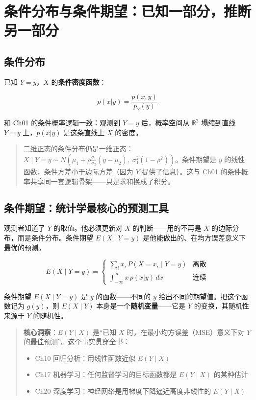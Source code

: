\documentclass[
]{book}
\providecommand{\tightlist}{%
  \setlength{\itemsep}{0pt}\setlength{\parskip}{0pt}}
\begin{document}
\section{条件分布与条件期望：已知一部分，推断另一部分}\label{ux6761ux4ef6ux5206ux5e03ux4e0eux6761ux4ef6ux671fux671bux5df2ux77e5ux4e00ux90e8ux5206ux63a8ux65adux53e6ux4e00ux90e8ux5206}

\subsection{条件分布}\label{ux6761ux4ef6ux5206ux5e03}

已知 \(Y = y\)，\(X\) 的\textbf{条件密度函数}：

\[p(x|y) = \frac{p(x,y)}{p_Y(y)}\]

和 Ch01 的条件概率逻辑一致：观测到 \(Y=y\) 后，概率空间从 \(\mathbb{R}^2\) 塌缩到直线 \(Y=y\) 上，\(p(x|y)\) 是这条直线上 \(X\) 的密度。

\begin{quote}
二维正态的条件分布仍是一维正态：\(X \mid Y=y \sim N\left(\mu_1 + \rho\frac{\sigma_1}{\sigma_2}(y-\mu_2), \; \sigma_1^2(1-\rho^2)\right)\)。条件期望是 \(y\) 的线性函数，条件方差小于边际方差（因为 \(Y\) 提供了信息）。这与 Ch01 的条件概率共享同一套逻辑骨架------只是求和换成了积分。
\end{quote}

\subsection{条件期望：统计学最核心的预测工具}\label{ux6761ux4ef6ux671fux671bux7edfux8ba1ux5b66ux6700ux6838ux5fc3ux7684ux9884ux6d4bux5de5ux5177}

观测者知道了 \(Y\) 的取值。他必须更新对 \(X\) 的判断------用的不再是 \(X\) 的边际分布，而是条件分布。条件期望 \(E(X \mid Y=y)\) 是他能做出的、在均方误差意义下最优的预测。

\[E(X \mid Y=y) = \begin{cases} \sum_i x_i \, P(X=x_i \mid Y=y) & \text{离散} \\ \int_{-\infty}^{\infty} x \, p(x|y) \, dx & \text{连续} \end{cases}\]

条件期望 \(E(X \mid Y=y)\) 是 \(y\) 的函数------不同的 \(y\) 给出不同的期望值。把这个函数记为 \(g(y)\)，则 \(E(X \mid Y)\) 本身是一个\textbf{随机变量}------它是 \(Y\) 的变换，其随机性来源于 \(Y\) 的随机性。

\begin{quote}
\textbf{核心洞察}：\(E(Y \mid X)\) 是``已知 \(X\) 时，在最小均方误差（MSE）意义下对 \(Y\) 的最佳预测''。这个事实贯穿全书：

\begin{itemize}
\tightlist
\item
  Ch10 回归分析：用线性函数近似 \(E(Y \mid X)\)
\item
  Ch17 机器学习：任何监督学习的目标函数都是 \(E(Y \mid X)\) 的某种估计
\item
  Ch20 深度学习：神经网络是用梯度下降逼近高度非线性的 \(E(Y \mid X)\)
\end{itemize}
\end{quote}
\end{document}
